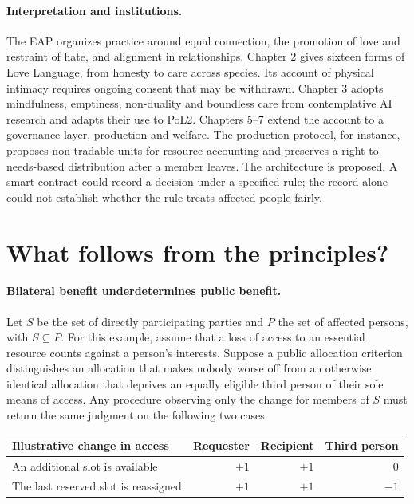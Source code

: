 \documentclass[11pt]{article}
\begin{document}
\paragraph{Interpretation and institutions.} The EAP organizes practice around equal connection, the promotion of love and restraint of hate, and alignment in relationships. Chapter 2 gives sixteen forms of Love Language, from honesty to care across species. Its account of physical intimacy requires ongoing consent that may be withdrawn. Chapter 3 adopts mindfulness, emptiness, non-duality and boundless care from contemplative AI research \cite{laukkonen} and adapts their use to PoL2. Chapters 5--7 extend the account to a governance layer, production and welfare. The production protocol, for instance, proposes non-tradable units for resource accounting and preserves a right to needs-based distribution after a member leaves. The architecture is proposed. A smart contract could record a decision under a specified rule; the record alone could not establish whether the rule treats affected people fairly.

\section{What follows from the principles?}
\paragraph{Bilateral benefit underdetermines public benefit.}
Let $S$ be the set of directly participating parties and $P$ the set of affected persons, with $S \subseteq P$. For this example, assume that a loss of access to an essential resource counts against a person's interests. Suppose a public allocation criterion distinguishes an allocation that makes nobody worse off from an otherwise identical allocation that deprives an equally eligible third person of their sole means of access. Any procedure observing only the change for members of $S$ must return the same judgment on the following two cases.

\begin{center}
\begin{tabular}{lrrr}
\hline
Illustrative change in access & Requester & Recipient & Third person\\
\hline
An additional slot is available & $+1$ & $+1$ & $0$\\
The last reserved slot is reassigned & $+1$ & $+1$ & $-1$\\
\hline
\end{tabular}
\end{center}
\end{document}
